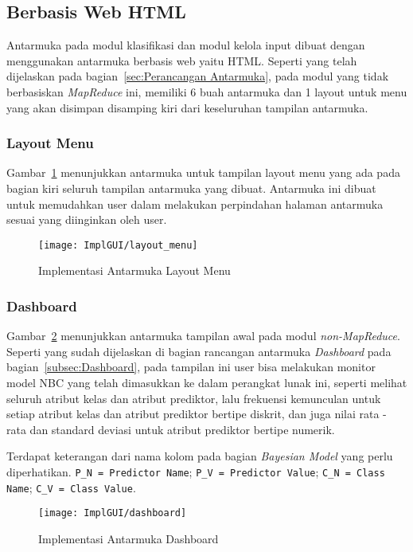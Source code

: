 \subsection{Berbasis Web HTML}
Antarmuka pada modul klasifikasi dan modul kelola input dibuat dengan menggunakan antarmuka berbasis web yaitu HTML. Seperti yang telah dijelaskan pada bagian~\ref{sec:Perancangan Antarmuka}, pada modul yang tidak berbasiskan \textit{MapReduce} ini, memiliki 6 buah antarmuka dan 1 layout untuk menu yang akan disimpan disamping kiri dari keseluruhan tampilan antarmuka.

\subsubsection{Layout Menu}
Gambar~\ref{fig:Implementasi Antarmuka Layout Menu} menunjukkan antarmuka untuk tampilan layout menu yang ada pada bagian kiri seluruh tampilan antarmuka yang dibuat. Antarmuka ini dibuat untuk memudahkan user dalam melakukan perpindahan halaman antarmuka sesuai yang diinginkan oleh user.
\begin{figure}[H]
	\centering
	\texttt{[image: ImplGUI/layout\_menu]}
	\caption[Implementasi Antarmuka Layout Menu]{Implementasi Antarmuka Layout Menu}
	\label{fig:Implementasi Antarmuka Layout Menu}
\end{figure}


\subsubsection{Dashboard}
Gambar~\ref{fig:Implementasi Antarmuka Dashboard} menunjukkan antarmuka tampilan awal pada modul \textit{non-MapReduce}. Seperti yang sudah dijelaskan di bagian rancangan antarmuka \textit{Dashboard} pada bagian~\ref{subsec:Dashboard}, pada tampilan ini user bisa melakukan monitor model NBC yang telah dimasukkan ke dalam perangkat lunak ini, seperti melihat seluruh atribut kelas dan atribut prediktor, lalu frekuensi kemunculan untuk setiap atribut kelas dan atribut prediktor bertipe diskrit, dan juga nilai rata - rata dan standard deviasi untuk atribut prediktor bertipe numerik. 

Terdapat keterangan dari nama kolom pada bagian \textit{Bayesian Model} yang perlu diperhatikan. \verb|P_N = Predictor Name|; \verb|P_V = Predictor Value|; \verb|C_N = Class Name|; \verb|C_V = Class Value|.

\begin{figure}[H]
	\centering
	\texttt{[image: ImplGUI/dashboard]}
	\caption[Implementasi Antarmuka Dashboard]{Implementasi Antarmuka Dashboard}
	\label{fig:Implementasi Antarmuka Dashboard}
\end{figure}


